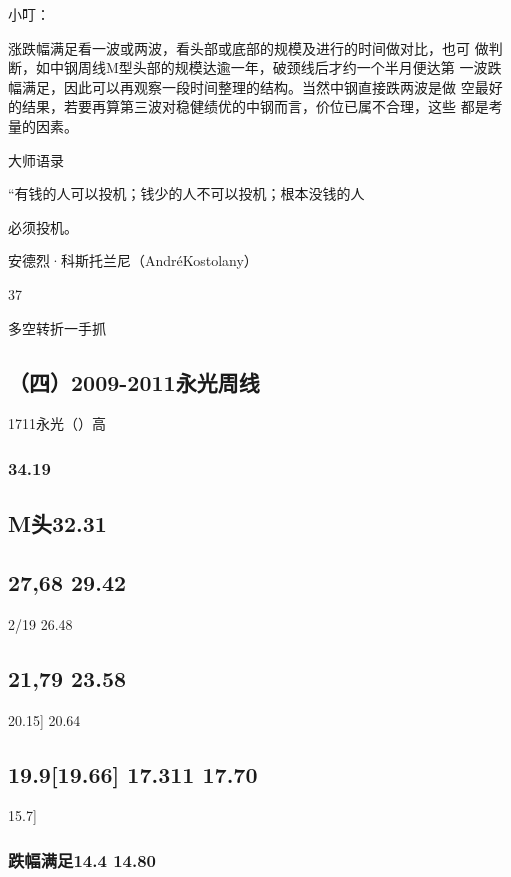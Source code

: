\documentclass{article}
\begin{document}
小叮：

涨跌幅满足看一波或两波，看头部或底部的规模及进行的时间做对比，也可 做判断，如中钢周线M型头部的规模达逾一年，破颈线后才约一个半月便达第 一波跌幅满足，因此可以再观察一段时间整理的结构。当然中钢直接跌两波是做 空最好的结果，若要再算第三波对稳健绩优的中钢而言，价位已属不合理，这些 都是考量的因素。

大师语录

“有钱的人可以投机；钱少的人不可以投机；根本没钱的人

必须投机。

安德烈·科斯托兰尼（AndréKostolany）

37

\clearpage

多空转折一手抓

\subsection{（四）2009-2011永光周线}

1711永光（）高

\subsubsection{34.19}

\subsection{M头32.31}

\subsection{27,68 29.42}

2/19 26.48

\subsection{21,79 23.58}

20.15] 20.64

\subsection{19.9[19.66] 17.311 17.70}

15.7]

\subsubsection{跌幅满足14.4 14.80}
\end{document}
